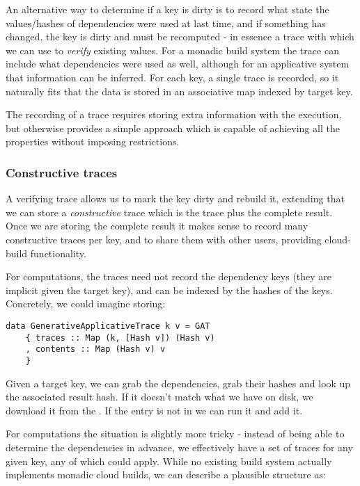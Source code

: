 An alternative way to determine if a key is dirty is to record what state the values/hashes of dependencies were used at last time, and if something has changed, the key is dirty and must be recomputed - in essence a trace with which we can use to \textit{verify} existing values. For a monadic build system the trace can include what dependencies were used as well, although for an applicative system that information can be inferred. For each key, a single trace is recorded, so it naturally fits that the data is stored in an associative map indexed by target key.

The recording of a trace requires storing extra information with the execution, but otherwise provides a simple approach which is capable of achieving all the properties without imposing restrictions.

\subsubsection{Constructive traces}

A verifying trace allows us to mark the key dirty and rebuild it, extending that we can store a \textit{constructive} trace which is the trace plus the complete result. Once we are storing the complete result it makes sense to record many constructive traces per key, and to share them with other users, providing cloud-build functionality.


For  computations, the traces need not record the dependency keys (they are implicit given the target key), and can be indexed by the hashes of the keys. Concretely, we could imagine storing:

\begin{verbatim}
data GenerativeApplicativeTrace k v = GAT
    { traces :: Map (k, [Hash v]) (Hash v)
    , contents :: Map (Hash v) v
    }
\end{verbatim}

Given a target key, we can grab the dependencies, grab their hashes and look up the associated result hash. If it doesn't match what we have on disk, we download it from the . If the entry is not in  we can run it and add it.

For  computations the situation is slightly more tricky - instead of being able to determine the dependencies in advance, we effectively have a set of traces for any given key, any of which could apply. While no existing build system actually implements monadic cloud builds, we can describe a plausible structure as:

